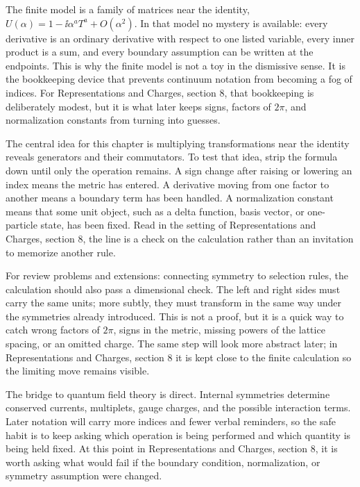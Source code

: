 The finite model is a family of matrices near the identity, \(U(\alpha)=1-\ii\alpha^aT^a+O(\alpha^2)\).  In that model no mystery is available: every derivative is an ordinary derivative with respect to one listed variable, every inner product is a sum, and every boundary assumption can be written at the endpoints.  This is why the finite model is not a toy in the dismissive sense.  It is the bookkeeping device that prevents continuum notation from becoming a fog of indices.  For Representations and Charges, section 8, that bookkeeping is deliberately modest, but it is what later keeps signs, factors of \(2\pi\), and normalization constants from turning into guesses.

The central idea for this chapter is multiplying transformations near the identity reveals generators and their commutators.  To test that idea, strip the formula down until only the operation remains.  A sign change after raising or lowering an index means the metric has entered.  A derivative moving from one factor to another means a boundary term has been handled.  A normalization constant means that some unit object, such as a delta function, basis vector, or one-particle state, has been fixed.  Read in the setting of Representations and Charges, section 8, the line is a check on the calculation rather than an invitation to memorize another rule.

For review problems and extensions: connecting symmetry to selection rules, the calculation should also pass a dimensional check.  The left and right sides must carry the same units; more subtly, they must transform in the same way under the symmetries already introduced.  This is not a proof, but it is a quick way to catch wrong factors of \(2\pi\), signs in the metric, missing powers of the lattice spacing, or an omitted charge.  The same step will look more abstract later; in Representations and Charges, section 8 it is kept close to the finite calculation so the limiting move remains visible.

The bridge to quantum field theory is direct.  Internal symmetries determine conserved currents, multiplets, gauge charges, and the possible interaction terms.  Later notation will carry more indices and fewer verbal reminders, so the safe habit is to keep asking which operation is being performed and which quantity is being held fixed.  At this point in Representations and Charges, section 8, it is worth asking what would fail if the boundary condition, normalization, or symmetry assumption were changed.

